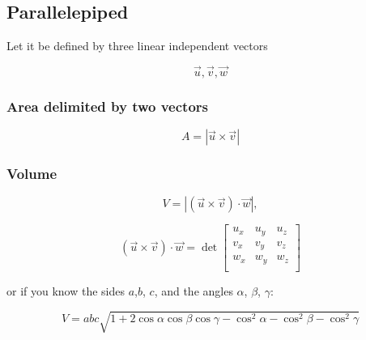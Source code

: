 \subsection{Parallelepiped}

Let it be defined by three linear independent vectors

\[
  \vec{u}, \vec{v}, \vec{w}
\]

\subsubsection{Area delimited by two vectors}

\[
  A = |\vec{u} \times \vec{v}|
\]

\subsubsection{Volume}

\[
    V = |(\vec{u} \times \vec{v}) \cdot \vec{w}|,
\]

\[
    (\vec{u} \times \vec{v}) \cdot \vec{w}
    = \det \begin{bmatrix}
        u_x & u_y & u_z \\
        v_x & v_y & v_z \\
        w_x & w_y & w_z \\
    \end{bmatrix}
\]

or if you know the sides $a$,$b$, $c$, and the angles $\alpha$, $\beta$, $\gamma$: 

\[
    V = abc\sqrt{1 + 2\cos \alpha \cos \beta \cos \gamma - \cos^2 \alpha - \cos^2 \beta - \cos^2 \gamma}
\]





